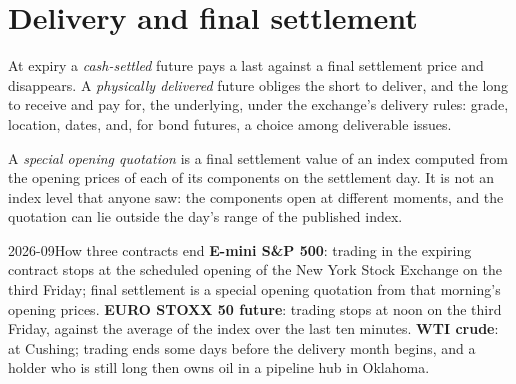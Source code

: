 \section{Delivery and final settlement}

\begin{definition}\label{def:m1:basis-roll-and-delivery:delivery}
At expiry a \emph{cash-settled} future pays a last
 against a final settlement price and disappears. A
\emph{physically delivered} future obliges the short
to deliver, and the long to receive and pay for, the underlying, under the
exchange's delivery rules: grade, location, dates, and, for bond futures, a
choice among deliverable issues.
\end{definition}

\begin{definition}\label{def:m1:basis-roll-and-delivery:soq}
A \emph{special opening quotation} is a
final settlement value of an index computed from the opening prices of each
of its components on the settlement day. It is not an index level that
anyone saw: the components open at different moments, and the quotation can
lie outside the day's range of the published index.
\end{definition}

\begin{dated}{2026-09}{How three contracts end}\label{dat:m1:basis-roll-and-delivery:ends}
\textbf{E-mini S\&P 500}: trading in the expiring contract stops at the
scheduled opening of the New York Stock Exchange on the third Friday; final
settlement is a special opening quotation from that morning's opening
prices. \textbf{EURO STOXX 50 future}: trading stops at noon on the third
Friday, against the average of the index over the last ten minutes.
\textbf{WTI crude}:  at Cushing; trading ends some days
before the delivery month begins, and a holder who is still long then owns
oil in a pipeline hub in Oklahoma.
\end{dated}

